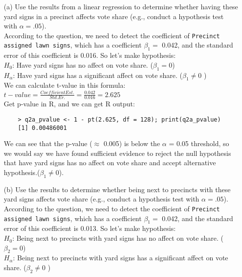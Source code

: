 \documentclass[12pt,letterpaper]{article}
\begin{document}
\newpage
\begin{enumerate}
	\item [(a)] Use the results from a linear regression to determine whether having these yard signs in a precinct affects vote share (e.g., conduct a hypothesis test with $\alpha = .05$).\\
	
	According to the question, we need to detect the coefficient of \texttt{Precinct assigned lawn signs}, which has a coefficient $\beta_1 = $ 0.042, and the standard error of this coefficient is 0.016. So let's make hypothesis:\\
	
	$H_0$: Have yard signs has no affect on vote share. ($\beta_1 = 0$) \\
	$H_\alpha$: Have yard signs has a significant affect on vote share. ($\beta_1 \neq 0$ )\\
	
	We can calculate t-value in this formula: $t-value = \frac{Coefficient Est.}{Std. Er.} = \frac{0.042}{0.016} = 2.625$\\
	Get p-value in R, and we can get R output: 
	\begin{verbatim}
	> q2a_pvalue <- 1 - pt(2.625, df = 128); print(q2a_pvalue)
	[1] 0.00486001
	\end{verbatim} 
	
	We can see that the p-value ($\approx$ 0.005) is below the $\alpha$ = 0.05 threshold, so we would say we have found sufficient evidence to reject the null hypothesis that have yard signs has no affect on vote share and accept alternative hypothesis.($\beta_1 \neq 0$).
	
	\vspace{.5cm}
	
	\item [(b)]  Use the results to determine whether being
	next to precincts with these yard signs affects vote
	share (e.g., conduct a hypothesis test with $\alpha = .05$).\\
	
	According to the question, we need to detect the coefficient of \texttt{Precinct assigned lawn signs}, which has a coefficient $\beta_1 = $ 0.042, and the standard error of this coefficient is 0.013. So let's make hypothesis:\\
	
	$H_0$: Being next to precincts with yard signs has no affect on vote share. ($\beta_2 = 0$) \\
	$H_\alpha$: Being next to precincts with yard signs has a significant affect on vote share. ($\beta_2 \neq 0$ )\\
	

\end{enumerate}
\end{document}
